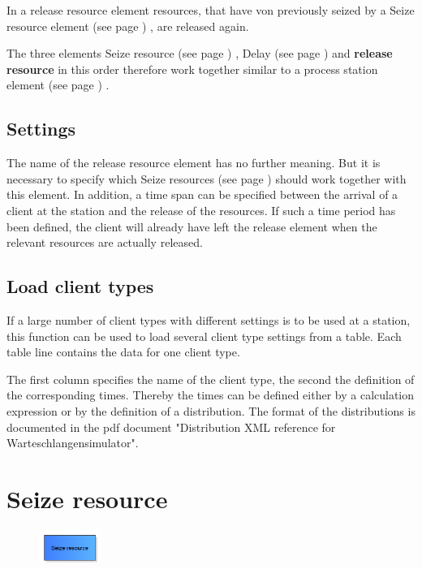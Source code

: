 In a release resource element resources, that have von previously seized by a
Seize resource element (see page \pageref{ref:ModelElementSeize}) , are released again.

The three elements Seize resource (see page \pageref{ref:ModelElementSeize}) , Delay (see page \pageref{ref:ModelElementDelay}) and
\textbf{release resource} in this order therefore work together similar to a
process station element (see page \pageref{ref:ModelElementProcess}) .

\subsection*{Settings}

The name of the release resource element has no further meaning. But it is necessary to specify
which Seize resources (see page \pageref{ref:ModelElementSeize}) should work together with this element.
In addition, a time span can be specified between the arrival of a client at the station and
the release of the resources. If such a time period has been defined, the client will already have
left the release element when the relevant resources are actually released.

\subsection*{Load client types}

If a large number of client types with different settings is to be used at a station, this function can be used
to load several client type settings from a table. Each table line contains the data for one client type.

The first column specifies the name of the client type, the second the definition of the corresponding times.
Thereby the times can be defined either by a calculation expression or by the definition of a
distribution. The format of the distributions is documented in the pdf document
"Distribution XML reference for Warteschlangensimulator".


\section{Seize resource}
\label{ref:ModelElementSeize}

\begin{figure}
\vspace{-22pt}
\includegraphics[width=2cm]{imageModelElementSeize.png}
\vspace{-22pt}
\end{figure}

